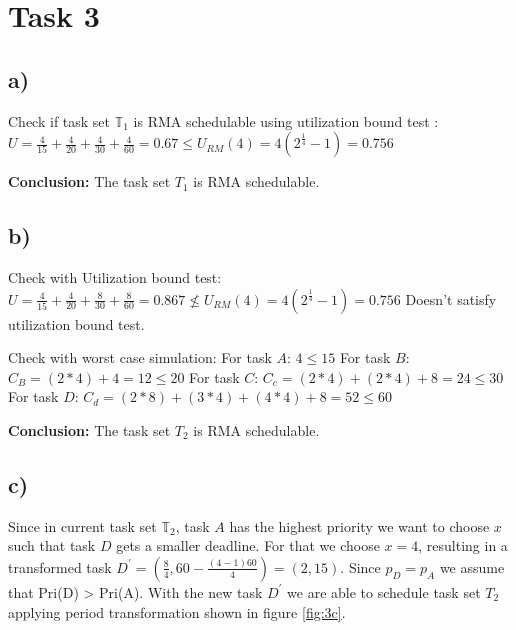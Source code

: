 \documentclass[10pt,a4paper]{article}
\begin{document}
\section*{Task 3}
\subsection*{a)}
Check if task set $\mathbb{T}_1$ is RMA schedulable using utilization bound test \cite[~p27]{RTCLecture}:
\newline
$U = \frac{4}{15} + \frac{4}{20} + \frac{4}{30} + \frac{4}{60} = 0.67 \leq U_{RM}(4) = 4(2^{\frac{1}{4}} - 1) = 0.756$

\textbf{Conclusion:} The task set $T_1$ is RMA schedulable.

\subsection*{b)}
Check with Utilization bound test:
\newline
$U = \frac{4}{15} + \frac{4}{20} + \frac{8}{30} + \frac{8}{60} = 0.867 \nleq U_{RM}(4) = 4(2^{\frac{1}{4}} - 1) = 0.756$
Doesn't satisfy  utilization bound test.

Check with worst case simulation:
\newline
For task $A$: $4 \leq 15$
\newline
For task $B$: $C_B = (2 * 4) + 4 = 12 \leq 20$
\newline
For task $C$: $C_c = (2 * 4) + (2 * 4) + 8 = 24 \leq 30$
\newline
For task $D$: $C_d = (2 * 8) + (3 * 4) + (4 * 4) + 8 = 52 \leq 60$

\textbf{Conclusion:} The task set $T_2$ is RMA schedulable.

\subsection*{c)}
Since in current task set $\mathbb{T}_2$, task $A$ has the highest priority we want to choose $x$ such that task $D$ gets a smaller deadline. 
For that we choose $x=4$, resulting in a transformed task $D^\prime = (\frac{8}{4}, 60 - \frac{(4 - 1)60}{4}) = (2, 15)$. Since $p_{D} = p_{A}$ we assume that Pri(D) > Pri(A). With the new task $D^\prime$ we are able to schedule task set $T_2$ applying period transformation shown in figure \ref{fig:3c}.
\end{document}
